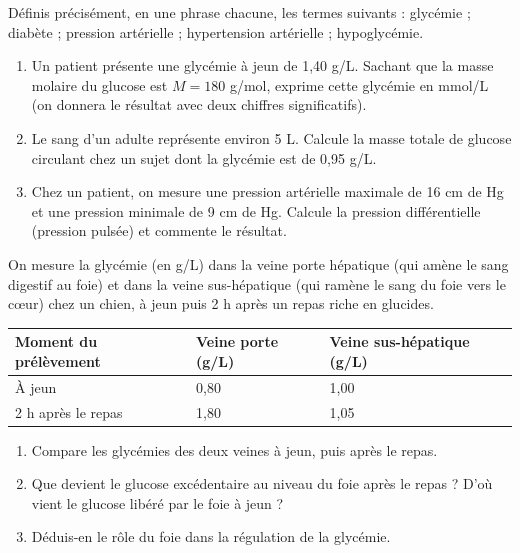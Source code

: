 \documentclass[11pt]{article}
\newcommand{\cle}[1]{{\popxbold\color{popdark}#1}}
\newcounter{popsec}
\newcounter{popsub}
\newcommand{\courssub}[1]{%
  \stepcounter{popsub}%
  \par\vspace{9pt}\noindent{\popxbold\fontsize{11.5}{13}\selectfont\color{popink}{\color{poporange}\thepopsec.\thepopsub}\hspace{6pt}#1}\par\nopagebreak\vspace{4pt}
}
\begin{document}
\begin{exercice}[Définitions]
Définis précisément, en une phrase chacune, les termes suivants : \cle{glycémie} ; \cle{diabète} ; \cle{pression artérielle} ; \cle{hypertension artérielle} ; \cle{hypoglycémie}.
\end{exercice}

\begin{exercice}
\begin{enumerate}
\item Un patient présente une glycémie à jeun de 1,40 g/L. Sachant que la masse molaire du glucose est $M = 180$ g/mol, exprime cette glycémie en mmol/L (on donnera le résultat avec deux chiffres significatifs).
\item Le sang d'un adulte représente environ 5 L. Calcule la masse totale de glucose circulant chez un sujet dont la glycémie est de 0,95 g/L.
\item Chez un patient, on mesure une pression artérielle maximale de 16 cm de Hg et une pression minimale de 9 cm de Hg. Calcule la pression différentielle (pression pulsée) et commente le résultat.
\end{enumerate}
\end{exercice}

\courssub{Je m'entraîne}

\begin{exercice}
On mesure la glycémie (en g/L) dans la veine porte hépatique (qui amène le sang digestif au foie) et dans la veine sus-hépatique (qui ramène le sang du foie vers le cœur) chez un chien, à jeun puis 2 h après un repas riche en glucides.
\begin{center}
\begin{tabularx}{\linewidth}{|l|X|X|}
\hline
\rowcolor{popblueL} \textbf{Moment du prélèvement} & \textbf{Veine porte (g/L)} & \textbf{Veine sus-hépatique (g/L)} \\
\hline
À jeun & 0,80 & 1,00 \\
\hline
2 h après le repas & 1,80 & 1,05 \\
\hline
\end{tabularx}
\end{center}
\begin{enumerate}
\item Compare les glycémies des deux veines à jeun, puis après le repas.
\item Que devient le glucose excédentaire au niveau du foie après le repas ? D'où vient le glucose libéré par le foie à jeun ?
\item Déduis-en le rôle du foie dans la régulation de la glycémie.
\end{enumerate}
\end{exercice}
\end{document}
